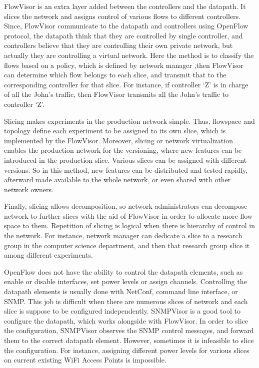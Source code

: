 \documentclass[english]{tktltiki2}
\theoremstyle{definition}
\theoremstyle{remark}
\begin{document}
FlowVisor is an extra layer added between the controllers and the datapath. It slices the network and assigns control of various flows to different controllers. Since, FlowVisor communicate to the datapath and controllers using OpenFlow protocol, the datapath think that they are controlled by single controller, and controllers believe that they are controlling their own private network, but actually they are controlling a virtual network. Here the method is to classify the flows based on a policy, which is defined by network manager ,then FlowVisor can determine which flow belongs to each slice, and transmit that to the corresponding controller for that slice. For instance, if controller ‘Z’ is in charge of all the John’s traffic, then FlowVisor transmits all the John’s traffic to controller ‘Z’. 

Slicing makes experiments in the production network simple. Thus, flowspace and topology define each experiment to be assigned to its own slice, which is implemented by the FlowVisor. Moreover, slicing or network virtualization enables the production network for the versioning, where new features can be introduced in the production slice. Various slices can be assigned with different versions. So in this method, new features can be distributed and tested rapidly, afterward made available to the whole network, or even shared with other network owners. 

Finally, slicing allows decomposition, so network administrators can decompose network to further slices with the aid of FlowVisor in order to allocate more flow space to them. Repetition of slicing is logical when there is hierarchy of control in the network. For instance, network manager can dedicate a slice to a research group in the computer science department, and then that research group slice it among different experiments. 

OpenFlow does not have the ability to control the datapath elements, such as enable or disable interfaces, set power levels or assign channels. Controlling the datapath elements is usually done with NetConf, command line interface, or SNMP. This job is difficult when there are numerous slices of network and each slice is suppose to be configured independently. SNMPVisor is a good tool to configure the datapath, which works alongside with FlowVisor. In order to slice the configuration, SNMPVisor observes the SNMP control messages, and forward them to the correct datapath element. However, sometimes it is infeasible to slice the configuration. For instance, assigning different power levels for various slices on current existing WiFi Access Points is impossible. 
\end{document}
